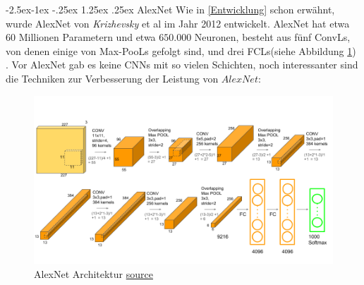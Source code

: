 \documentclass[12pt,a4paper]{scrartcl}
\makeatletter
\numberwithin{equation}{section}
\renewcommand\paragraph{\@startsection{paragraph}{4}{\z@}%
	{-2.5ex\@plus -1ex \@minus -.25ex}%
	{1.25ex \@plus .25ex}%
	{\normalfont\normalsize\bfseries}}
\makeatother
\begin{document}
\paragraph{AlexNet}
Wie in \ref{Entwicklung} schon erwähnt, wurde AlexNet von \textit{Krizhevsky} et al \cite{AlexNet} im Jahr 2012 entwickelt. AlexNet hat etwa $ 60 $ Millionen Parametern und etwa $ 650.000 $ Neuronen, besteht aus fünf \acsp{ConvL}, von denen einige von Max-\acsp{PooL} gefolgt sind, und drei \acsp{FCL}(siehe Abbildung \ref{fig:AlexNet}) \cite{AlexNet}. Vor  AlexNet  gab es keine \acsp{CNN} mit so vielen Schichten, noch interessanter sind die Techniken zur Verbesserung der Leistung von  $ AlexNet $:
\begin{figure}[h!]
	\centering
	\includegraphics[width=\textwidth ]{AlexNet}
	\caption{ AlexNet Architektur \href{https://neurohive.io/en/popular-networks/alexnet-imagenet-classification-with-deep-convolutional-neural-networks/}{ source} }
	\label{fig:AlexNet}
\end{figure}
\end{document}
